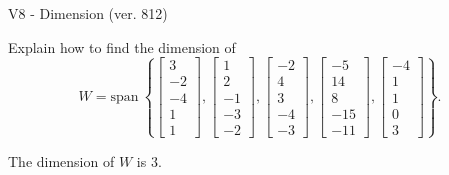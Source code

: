\begin{exercise}
  \begin{exerciseTitle}V8 - Dimension (ver. 812)\end{exerciseTitle}
  \begin{exerciseStatement}
    Explain how to find the dimension of 
\[W=\mathrm{span}\ \left\{\left[\begin{array}{r}
3 \\
-2 \\
-4 \\
1 \\
1
\end{array}\right] , \left[\begin{array}{r}
1 \\
2 \\
-1 \\
-3 \\
-2
\end{array}\right] , \left[\begin{array}{r}
-2 \\
4 \\
3 \\
-4 \\
-3
\end{array}\right] , \left[\begin{array}{r}
-5 \\
14 \\
8 \\
-15 \\
-11
\end{array}\right] , \left[\begin{array}{r}
-4 \\
1 \\
1 \\
0 \\
3
\end{array}\right]\right\}.\]



  \end{exerciseStatement}
  \begin{exerciseAnswer}
   The dimension of \(W\) is  \(3\).
  


  \end{exerciseAnswer}
\end{exercise}